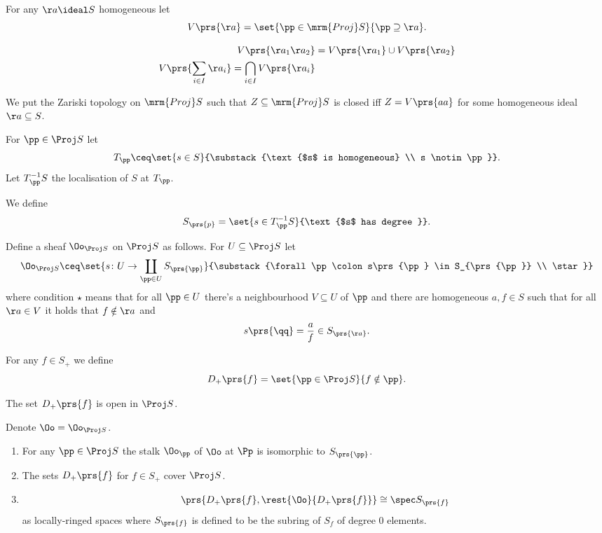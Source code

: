 \documentclass[10pt,a4paper,twoside,openany,hidelinks]{book}
\begin{document}
\begin{definition}
For any $\aa \ideal S$ homogeneous let
\[V\prs{\aa} = \set{\pp \in \mrm{Proj}S}{\pp \supseteq \aa} \text{.}\]
\end{definition}

\begin{lemma}
\begin{align*}
V\prs{\aa_1 \aa_2} &= V\prs{\aa_1} \cup V\prs{\aa_2} \\
V\prs{\sum_{i \in I} \aa_i} = \bigcap_{i \in I} V\prs{\aa_i}
\end{align*}
\end{lemma}

\begin{definition}
We put the Zariski topology on $\mrm{Proj}S$ such that $Z \subseteq \mrm{Proj}S$ is closed iff $Z = V\prs{aa}$ for some homogeneous ideal $\aa \subseteq S$.
\end{definition}

\begin{definition}
For $\pp \in \Proj S$ let
\[T_\pp \ceq \set{s \in S}{\substack{\text{$s$ is homogeneous} \\ s \notin \pp}} \text{.}\]
Let $T_\pp^{-1} S$ the localisation of $S$ at $T_\pp$.

We define
\[S_{\prs{p}} = \set{s \in T_\pp^{-1} S}{\text{$s$ has degree }} \text{.}\]

Define a sheaf $\Oo_{\Proj S}$ on $\Proj S$ as follows.
For $U \subseteq \Proj S$ let
\[\Oo_{\Proj S} \ceq \set{s \colon U \to \coprod_{\pp \in U} S_{\prs{\pp}}}{\substack{\forall \pp \colon s\prs{\pp} \in S_{\prs{\pp}} \\ \star}}\]
where condition $\star$ means that for all $\pp \in U$ there's a neighbourhood $V \subseteq U$ of $\pp$ and there are homogeneous $a,f \in S$ such that for all $\aa \in V$ it holds that $f \notin \aa$ and
\[s\prs{\qq} = \frac{a}{f} \in S_{\prs{\aa}} \text{.}\]
\end{definition}

\begin{definition}
For any $f \in S_+$ we define \[D_+\prs{f} = \set{\pp \in \Proj S}{f \notin \pp} \text{.}\]
\end{definition}

\begin{remark}
The set $D_+\prs{f}$ is open in $\Proj S$.
\end{remark}

\begin{proposition}
Denote $\Oo = \Oo_{\Proj S}$.
\begin{enumerate}
\item For any $\pp \in \Proj S$ the stalk $\Oo_\pp$ of $\Oo$ at $\Pp$ is isomorphic to $S_{\prs{\pp}}$.
\item
The sets $D_+\prs{f}$ for $f \in S_+$ cover $\Proj S$.
\item
\[\prs{D_+\prs{f}, \rest{\Oo}{D_+\prs{f}}} \cong \spec S_{\prs{f}}\]
as locally-ringed spaces where $S_{\prs{f}}$ is defined to be the subring of $S_f$ of degree $0$ elements.
\end{enumerate}
\end{proposition}
\end{document}
